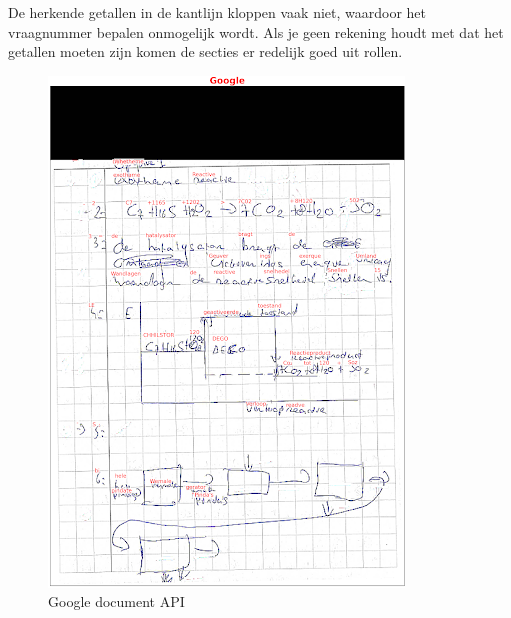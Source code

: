 \documentclass[12pt]{article}
\begin{document}
\begin{multicols}{2}
De herkende getallen in de kantlijn kloppen vaak niet, waardoor het vraagnummer bepalen onmogelijk wordt. Als je geen rekening houdt met dat het getallen moeten zijn komen de secties er redelijk goed uit rollen.
\begin{figure}
    \centering
    \includegraphics[width=1\linewidth]{./images/methoden/inscannen/sectie/hand/google.png}
    \caption{Google document API}\label{fig:google-doc-api}
\end{figure}
\begin{figure}
    \centering

\end{figure}
\end{multicols}
\end{document}
